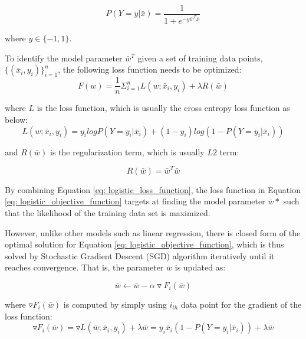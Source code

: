 \begin{equation}
    P(Y=y|\bar{x}) = \frac{1}{1+e^{-y\bar{w}^T\bar{x}}}
\end{equation}

where $y \in \{-1,1\}$.

To identify the model parameter $\bar{w}^T$ given a set of training data points, $\{(\bar{x}_i, y_i)\}_{i=1}^n$, the following loss function needs to be optimized:
\begin{equation}\label{eq: logistic_objective_function}
    F(w) = \frac{1}{n}\Sigma_{i=1}^nL(w;\bar{x}_i, y_i) + \lambda R(\bar{w})
\end{equation}

where $L$ is the loss function, which is usually the cross entropy loss function as below:
\begin{equation}\label{eq: logistic_loss_function}
    L(w; \bar{x}_i, y_i) = y_ilogP(Y=y_i|\bar{x}_i) + (1-y_i)log(1-P(Y=y_i|\bar{x}_i))
\end{equation}

and $R(\bar{w})$ is the regularization term, which is usually $L2$ term:

\begin{equation}
    R(\bar{w}) = \bar{w}^T\bar{w}
\end{equation}


By combining Equation \ref{eq: logistic_loss_function}, the loss function in Equation \ref{eq: logistic_objective_function} targets at finding the model parameter $\bar{w}*$ such that the likelihood of the training data set is maximized. 

However, unlike other models such as linear regression, there is closed form of the optimal solution for Equation \ref{eq: logistic_objective_function}, which is thus solved by Stochastic Gradient Descent (SGD) algorithm \cite{robert2014machine} iteratively until it reaches convergence. That is, the parameter $\bar{w}$ is updated as:

\begin{equation}
    \bar{w} \leftarrow \bar{w} - \alpha \triangledown F_i(\bar{w})
\end{equation}

where $\triangledown F_i(\bar{w})$ is computed by simply using $i_{th}$ data point for the gradient of the loss function:
\begin{equation}
    \triangledown F_i(\bar{w}) = \triangledown L(\bar{w};\bar{x}_i,y_i) + \lambda \bar{w} = y_i\bar{x}_i(1-P(Y=y_i|\bar{x}_i)) + \lambda \bar{w}
\end{equation}

